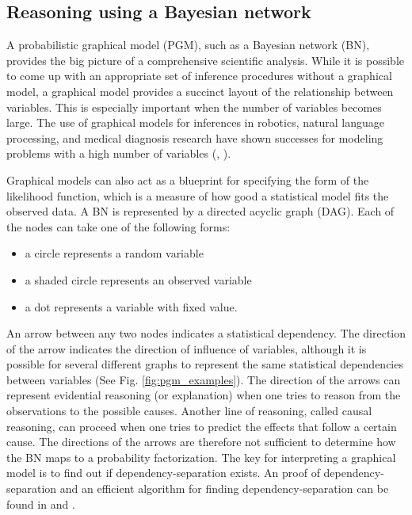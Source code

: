 \subsection{Reasoning using a Bayesian network}
A probabilistic graphical model (PGM), such as a Bayesian network (BN), 
provides the big picture of a comprehensive scientific analysis. 
While it is possible to come up with an
appropriate set of inference procedures without a graphical model, a graphical
model provides a succinct layout of the relationship between variables.
This is especially important when the number of variables becomes large.
The use of graphical models for inferences in robotics, natural language
processing, and medical diagnosis research have 
shown successes for modeling problems with a high number of variables 
(\citealt{Heckerman1992a}, \citealt{Koller2009}).   

Graphical models can also act as a blueprint for specifying the form of the 
 likelihood function, which is a measure of how good a statistical model fits
the observed data. A BN is represented by a directed acyclic graph (DAG). 
Each of the nodes can take one of the following forms:
\begin{itemize}
		\item a circle represents a random variable  
		\item a shaded circle represents an observed variable
		\item a dot represents a variable with fixed value.
\end{itemize}
An arrow between any two nodes indicates a statistical dependency. 
The direction of the arrow indicates the direction of influence 
of variables, although it is possible for several different graphs to represent 
the same statistical dependencies between variables 
(See Fig. \ref{fig:pgm_examples}).
The direction of the arrows can represent evidential reasoning (or explanation)
when one tries to reason from the observations to the possible causes.
Another line of reasoning, called causal reasoning, can proceed when 
one tries to predict the effects that follow a certain cause.
The directions of the arrows are therefore not sufficient to determine how the
BN maps to a probability factorization.
The key for interpreting a graphical
model is to find out if dependency-separation exists. 
An proof of dependency-separation and an efficient algorithm for finding 
dependency-separation can be found in \cite{Meek2013} and \cite{Shachter2013}.

